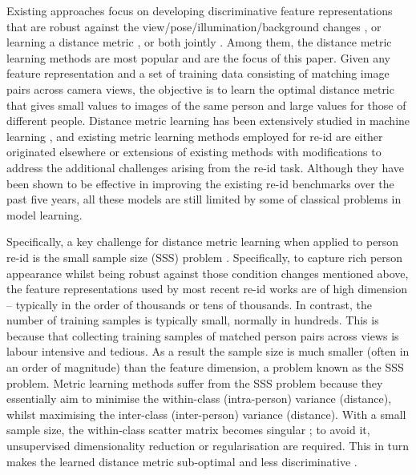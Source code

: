 \documentclass[10pt,twocolumn,letterpaper]{article}
\begin{document}
Existing approaches focus on developing discriminative feature representations that are robust against the view/pose/illumination/background changes \cite{Gray_PedestrianRecognitionEnsembleLocalFeature_08a,yang2014salient,Farenzena_cvpr10,
  kviatkovsky2013color,ma2012local,zhao2014learning,liao2015person}, or learning a  distance metric  \cite{Gray_PedestrianRecognitionEnsembleLocalFeature_08a,koestinger2012large,
  Prosser_PerReSVR_10a,Zheng_RDC_2013a,mignon2012pcca,li2013person,pedagadi2013local,
  li2013learning,zhao2013unsupervised,zhao2013person,xiong2014person,ma2014person,lisantiperson,liao2015person}, or  both jointly \cite{li2014deepreid,ahmed2015improved}.  Among them, the distance metric learning methods are most popular and are the focus of this paper. Given any feature representation and a set of training data consisting of matching image pairs across camera views, the objective is to learn the optimal distance metric that gives small values to images of the same person and large values for those of different people. Distance metric learning has been extensively studied in machine learning \cite{yang2006distance}, and existing
metric learning methods employed for re-id are either originated elsewhere or extensions of existing methods with modifications to address the additional challenges arising from the re-id task. Although they have been shown to be effective in improving the existing re-id benchmarks over the past five years, all these models are still limited by some of classical problems in model learning.

Specifically, a key challenge for distance metric learning when applied to person re-id is the small sample size (SSS) problem \cite{ChenLKLY00}. Specifically, to capture rich person appearance whilst being robust against those condition changes mentioned above, the feature representations used by most recent re-id works are of high dimension -- typically in the order of thousands or tens of thousands. In contrast, the number of training samples is typically small, normally in hundreds. This is because that collecting training samples of matched person pairs across views is labour intensive and tedious. As a result the sample size is much smaller (often in an order of magnitude) than the feature dimension, a problem known as the SSS problem. Metric learning methods suffer from the SSS problem because they essentially aim to minimise the within-class (intra-person) variance (distance), whilst maximising the inter-class (inter-person) variance (distance). With a small sample size, the within-class scatter matrix becomes singular \cite{ChenLKLY00}; to avoid it,  unsupervised dimensionality reduction or regularisation are required. This in turn makes the learned distance metric sub-optimal and less discriminative \cite{ChenLKLY00,ZhengZZ05,guo2006null}. %
\end{document}
